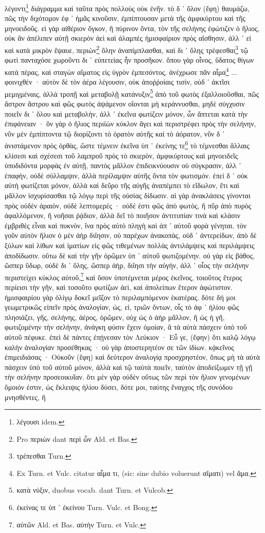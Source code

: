 \documentclass[a4paper, 11pt, oneside, polutonikogreek, german]{article}
\begin{document}
λέγοντι\footnote{λέγουσι idem.} διάγραμμα καὶ ταῦτα πρὸς πολλοὺς οὐκ ἐνῆν. τὸ δ ᾽ ὅλον (ἔφη) θαυμάζω, πῶς τὴν διχότομον ἐφ ᾽ ἡμᾶς κινοῦσιν, ἐμπίπτουσαν μετὰ τῆς ἀμφικύρτου καὶ τῆς μηνοειδοῦς. εἰ γὰρ αἰθέριον ὄγκον, ἢ πύρινον ὄντα, τὸν τῆς σελήνης ἐφώτιζεν ὁ ἥλιος, οὐκ ἂν ἀπέλιπεν αὐτῇ σκιερὸν ἀεὶ καὶ ἀλαμπὲς ἡμισφαίριον πρὸς αἴσθησιν, ἀλλ ᾽ εἰ καὶ κατὰ μικρὸν ἔψαυε, περιὼν\footnote{Pro περιὼν dant περὶ ὧν Ald. et Bas.} ὅλην ἀναπίμπλασθαι, καὶ δι ᾽ ὅλης τρέφεσθαι\footnote{τρέπεσθαι Turn.} τῷ φωτὶ πανταχόσε χωροῦντι δι ᾽ εὐπετείας ἦν προσῆκον. ὅπου γὰρ οἶνος, ὕδατος θίγων κατὰ πέρας, καὶ σταγὼν αἵματος εἰς ὑγρὸν ἐμπεσόντος, ἀνέχρωσε πᾶν αἷμα\footnote{Ex Turn. et Vulc. citatur αἷμα τι, (sic: sine dubio voluerunt αἵματι) vel ἅμα.} ... φοινιχθέν · αὐτὸν δὲ τὸν ἀέρα λέγουσιν, οὐκ ἀποῤῥοίαις τισὶν, οὐδ ᾽ ἀκτῖσι μεμιγμέναις, ἀλλὰ τροπῇ καὶ μεταβολῇ κατάνυξιν\footnote{κατὰ νύξιν, duobus vocab. dant Turn. et Vulcob.} ἀπὸ τοῦ φωτὸς ἐξαλλοιοῦσθαι, πῶς ἄστρον ἄστρου καὶ φῶς φωτὸς ἁψάμενον οἴονται μὴ κεράννυσθαι, μηδὲ σύγχυσιν ποιεῖν δι ᾽ ὅλου καὶ μεταβολὴν, ἀλλ ᾽ ἐκεῖνα φωτίζειν μόνον, ὧν ἅπτεται κατὰ τὴν ἐπιφάνειαν · ὃν γὰρ ὁ ἥλιος περιϊὼν κύκλον ἄγει καὶ περιστρέφει πρὸς τὴν σελήνην, νῦν μὲν ἐμπίπτοντα τῷ διορίζοντι τὸ ὁρατὸν αὐτῆς καὶ τὸ ἀόρατον, νῦν δ ᾽ ἀνιστάμενον πρὸς ὀρθὰς, ὥστε τέμνειν ἐκεῖνα ὑπ ᾽ ἐκείνης τε\footnote{ἐκείνας τε ὑπ ᾽ ἐκείνου Turn. Vulc. et Bong.} τὸ τέμνεσθαι ἄλλαις κλίσεσι καὶ σχέσεσι τοῦ λαμπροῦ πρὸς τὸ σκιερὸν, ἀμφικύρτους καὶ μηνοειδεῖς ὑποδιδόντα μορφὰς ἐν αὐτῇ, παντὸς μᾶλλον ἐπιδεικνύουσιν οὐ σύγκρασιν, ἀλλ ᾽ ἐπαφὴν, οὐδὲ σύλλαμψιν, ἀλλὰ περίλαμψιν αὐτῆς ὄντα τὸν φωτισμόν. ἐπεὶ δ ᾽ οὐκ αὐτὴ φωτίζεται μόνον, ἀλλὰ καὶ δεῦρο τῆς αὐγῆς ἀναπέμπει τὸ εἴδωλον, ἔτι καὶ μᾶλλον ἰσχυρίσασθαι τῷ λόγῳ περὶ τῆς οὐσίας δίδωσιν. αἱ γὰρ ἀνακλάσεις γίνονται πρὸς οὐδὲν ἀραιὸν, οὐδὲ λεπτομερές · οὐδέ ἐστι φῶς ἀπὸ φωτὸς, ἢ πῦρ ἀπὸ πυρὸς ἀφαλλόμενον, ἢ νοῆσαι ῥᾴδιον, ἀλλὰ δεῖ τὸ ποιῆσον ἀντιτυπίαν τινὰ καὶ κλάσιν ἐμβριθὲς εἶναι καὶ πυκνὸν, ἵνα πρὸς αὐτὸ πληγὴ καὶ ἀπ ᾽ αὐτοῦ φορὰ γένηται. τὸν γοῦν αὐτὸν ἥλιον ὁ μὲν ἀὴρ διΐησιν, οὐ παρέχων ἀνακοπὰς, οὐδ ᾽ ἀντερείδων, ἀπὸ δὲ ξύλων καὶ λίθων καὶ ἱματίων εἰς φῶς τιθεμένων πολλὰς ἀντιλάμψεις καὶ περιλάμψεις ἀποδίδωσιν. οὕτω δὲ καὶ τὴν γῆν ὁρῶμεν ὑπ ᾽ αὐτοῦ φωτιζομένην. οὐ γὰρ εἰς βάθος, ὥσπερ ὕδωρ, οὐδὲ δι ᾽ ὅλης, ὥσπερ ἀὴρ, διΐησι τὴν αὐγὴν, ἀλλ ᾽ οἷος τὴν σελήνην περιστείχει κύκλος αὐτοῦ,\footnote{αὐτῶν Ald. et Bas. αὐτὴν Turn. et Vulc.} καὶ ὅσον ὑποτέμνεται μέρος ἐκεῖνος, τοιοῦτος ἕτερος περίεισι τὴν γῆν, καὶ τοσοῦτο φωτίζων ἀεὶ, καὶ ἀπολείπων ἕτερον ἀφώτιστον. ἡμισφαιρίου γὰρ ὀλίγῳ δοκεῖ μεῖζον τὸ περιλαμπόμενον ἑκατέρας. δότε δή μοι γεωμετρικῶς εἰπεῖν πρὸς ἀναλογίαν, ὡς, εἰ, τριῶν ὄντων, οἷς τὸ ἀφ ᾽ ἡλίου φῶς πλησιάζει, γῆς, σελήνης, ἀέρος, ὁρῶμεν, οὐχ ὡς ὁ ἀὴρ μᾶλλον, ἢ ὡς ἡ γῆ, φωτιζομένην τὴν σελήνην, ἀνάγκη φύσιν ἔχειν ὁμοίαν, ἃ τὰ αὐτὰ πάσχειν ὑπὸ τοῦ αὐτοῦ πέφυκε. ἐπεὶ δὲ πάντες ἐπῄνεσαν τὸν Λεύκιον · Εὖ γε, (ἔφην) ὅτι καλῷ λόγῳ καλὴν ἀναλογίαν προσέθηκας · οὐ γὰρ ἀποστερητέον σε τῶν ἰδίων. κᾀκεῖνος ἐπιμειδιάσας · Οὐκοῦν (ἔφη) καὶ δεύτερον ἀναλογίᾳ προσχρηστέον, ὅπως μὴ τὰ αὐτὰ πάσχειν ὑπὸ τοῦ αὐτοῦ μόνον, ἀλλὰ καὶ τῷ ταὐτὰ ποιεῖν, ταὐτὸν ἀποδείξωμεν τῇ γῇ τὴν σελήνην προσεοικυῖαν. ὅτι μὲν γὰρ οὐδὲν οὕτως τῶν περὶ τὸν ἥλιον γενομένων ὅμοιόν ἐστιν, ὡς ἔκλειψις ἡλίου δύσει, δότε μοι, ταύτης ἔναγχος τῆς συνόδου μνησθέντες, ἢ 
\end{document}
